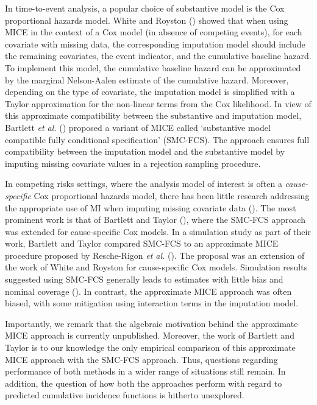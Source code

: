 \documentclass[
  letterpaper,
  DIV=11,
  numbers=noendperiod]{scrreprt}
\begin{document}
In time-to-event analysis, a popular choice of substantive model is the
Cox proportional hazards model. White and Royston
() showed that
when using MICE in the context of a Cox model (in absence of competing
events), for each covariate with missing data, the corresponding
imputation model should include the remaining covariates, the event
indicator, and the cumulative baseline hazard. To implement this model,
the cumulative baseline hazard can be approximated by the marginal
Nelson-Aalen estimate of the cumulative hazard. Moreover, depending on
the type of covariate, the imputation model is simplified with a Taylor
approximation for the non-linear terms from the Cox likelihood. In view
of this approximate compatibility between the substantive and imputation
model, Bartlett \emph{et al.}
() proposed
a variant of MICE called `substantive model compatible fully conditional
specification' (SMC-FCS). The approach ensures full compatibility
between the imputation model and the substantive model by imputing
missing covariate values in a rejection sampling procedure.

In competing risks settings, where the analysis model of interest is
often a \emph{cause-specific} Cox proportional hazards model, there has
been little research addressing the appropriate use of MI when imputing
missing covariate data
(). The most prominent work is that of Bartlett and Taylor
(), where the
SMC-FCS approach was extended for cause-specific Cox models. In a
simulation study as part of their work, Bartlett and Taylor compared
SMC-FCS to an approximate MICE procedure proposed by Resche-Rigon
\emph{et al.}
(). The
proposal was an extension of the work of White and Royston for
cause-specific Cox models. Simulation results suggested using SMC-FCS
generally leads to estimates with little bias and nominal coverage
(). In contrast, the approximate MICE approach was often
biased, with some mitigation using interaction terms in the imputation
model.

Importantly, we remark that the algebraic motivation behind the
approximate MICE approach is currently unpublished. Moreover, the work
of Bartlett and Taylor is to our knowledge the only empirical comparison
of this approximate MICE approach with the SMC-FCS approach. Thus,
questions regarding performance of both methods in a wider range of
situations still remain. In addition, the question of how both the
approaches perform with regard to predicted cumulative incidence
functions is hitherto unexplored.
\end{document}
